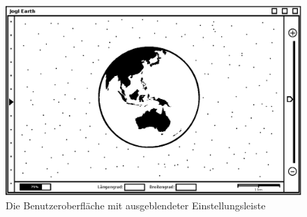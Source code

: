 \documentclass[10pt]{scrreprt}
\begin{document}
\begin{figure}
	\centering
	\includegraphics[scale=0.9]{GUI-Ausgeblendet.eps}
	\caption{Die Benutzeroberfläche mit ausgeblendeter Einstellungsleiste}
\end{figure}
\end{document}
